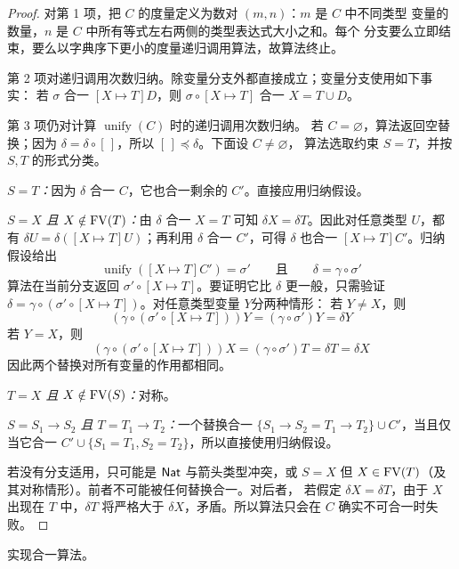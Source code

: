 \begin{proof}
对第 1 项，把 \(C\) 的度量定义为数对 \((m,n)\)：\(m\) 是 \(C\) 中不同类型
变量的数量，\(n\) 是 \(C\) 中所有等式左右两侧的类型表达式大小之和。每个
分支要么立即结束，要么以字典序下更小的度量递归调用算法，故算法终止。

第 2 项对递归调用次数归纳。除变量分支外都直接成立；变量分支使用如下事实：
若 \(\sigma\) 合一 \([X\mapsto T]D\)，则
\(\sigma\circ[X\mapsto T]\) 合一
\({X=T}\cup D\)。

第 3 项仍对计算 \(\operatorname{unify}(C)\) 时的递归调用次数归纳。
若 \(C=\varnothing\)，算法返回空替换；因为
\(\delta=\delta\circ[\,]\)，所以 \([\,]\preceq\delta\)。下面设 \(C\ne\varnothing\)，
算法选取约束 \(S=T\)，并按 \(S,T\) 的形式分类。

\emph{\(S=T\)：}因为 \(\delta\) 合一 \(C\)，它也合一剩余的 \(C'\)。直接应用归纳假设。

\emph{\(S=X\) 且 \(X\notin\operatorname{FV}(T)\)：}由 \(\delta\) 合一 \(X=T\) 可知
\(\delta X=\delta T\)。因此对任意类型 \(U\)，都有
\(\delta U=\delta([X\mapsto T]U)\)；再利用 \(\delta\) 合一 \(C'\)，可得
\(\delta\) 也合一 \([X\mapsto T]C'\)。归纳假设给出
\[
\operatorname{unify}([X\mapsto T]C')=\sigma'
\qquad\text{且}\qquad
\delta=\gamma\circ\sigma'
\]
算法在当前分支返回
\(\sigma'\circ[X\mapsto T]\)。要证明它比 \(\delta\) 更一般，只需验证
\(\delta=\gamma\circ(\sigma'\circ[X\mapsto T])\)。对任意类型变量 \(Y\)分两种情形：
若 \(Y\ne X\)，则
\[
(\gamma\circ(\sigma'\circ[X\mapsto T]))Y
=(\gamma\circ\sigma')Y=\delta Y
\]
若 \(Y=X\)，则
\[
(\gamma\circ(\sigma'\circ[X\mapsto T]))X
=(\gamma\circ\sigma')T=\delta T=\delta X
\]
因此两个替换对所有变量的作用都相同。

\emph{\(T=X\) 且 \(X\notin\operatorname{FV}(S)\)：}对称。

\emph{\(S=S_1\to S_2\) 且 \(T=T_1\to T_2\)：}一个替换合一
\(\{S_1\to S_2=T_1\to T_2\}\cup C'\)，当且仅当它合一
\(C'\cup\{S_1=T_1,S_2=T_2\}\)，所以直接使用归纳假设。

若没有分支适用，只可能是 \(\mathsf{Nat}\) 与箭头类型冲突，或 \(S=X\)
但 \(X\in\operatorname{FV}(T)\)（及其对称情形）。前者不可能被任何替换合一。对后者，
若假定 \(\delta X=\delta T\)，由于 \(X\) 出现在 \(T\) 中，\(\delta T\) 将严格大于
\(\delta X\)，矛盾。所以算法只会在 \(C\) 确实不可合一时失败。
\end{proof}

\begin{exercise}
\label{ex:22.4.6}
实现合一算法。
\end{exercise}

